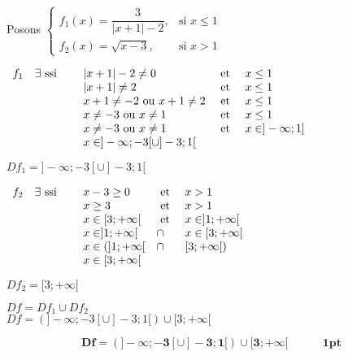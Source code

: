 \documentclass[12pt,a4paper]{article}
\begin{document}
\begin{enumerate}
Posons  $\left\{
        \begin{array}{ll}
            f_{1}(x) = \dfrac{3}{|x+1| - 2}, & \text{si } x \leq 1 \\
            f_{2}(x) = \sqrt{x - 3}, & \text{si } x > 1
        \end{array}
    \right.$
    
\( 
\begin{array}{llll}
            f_{1}\quad \exists \text{ ssi }& \quad  |x+1| - 2 \neq 0 & \text{ et } & x \leq 1 \\
       			 																&\quad  |x+1|  \neq 2 & \text{ et } & x \leq 1 \\
       																			&\quad  x+1  \neq -2\text{ ou } x+1  \neq 2 & \text{ et } & x \leq 1 \\
       																			&\quad  x \neq -3\text{ ou } x \neq 1 & \text{ et } & x \leq 1 \\
       																			&\quad  x \neq -3\text{ ou } x \neq 1 & \text{ et } & x \in ]-\infty;1] \\
       																			&\quad x \in ]-\infty;-3[\cup]-3;1[\\
        \end{array} \\
\) 

\begin{center}
\( Df_{1} = ]-\infty;-3[\cup]-3;1[ \)\\
\end{center}     

\( 
\begin{array}{llll}
            f_{2}\quad \exists \text{ ssi }& \quad  x - 3 \geq 0 & \text{ et } & x > 1 \\
       			 																& \quad  x  \geq 3 & \text{ et } & x > 1 \\
       																			& \quad  x\in [3;+\infty[ & \text{ et } & x\in ]1;+\infty[\\
       																			& \quad  x \in ]1;+\infty[ & \cap & x \in[3;+\infty[\\
       																			& \quad  x \in ( ]1;+\infty[ & \cap &  [3;+\infty[)\\
       																			& \quad x \in [3;+\infty[
        \end{array} \\
\) 

\begin{center}
\( Df_{2} = [3;+\infty[ \)\\
\end{center}     

\begin{center}
\( Df=Df_{1} \cup Df_{2} \)\\
\( Df=(]-\infty;-3[\cup]-3;1[)\cup[3;+\infty[ \)
\end{center} 

              \begin{resultbox}
            \[
                \mathbf{Df = \left( ]-\infty;-3[\cup]-3;1[\right) \cup[3;+\infty[ \quad\quad\quad \textbf{1pt}}
            \]
        \end{resultbox}     
    
\end{enumerate}
\end{document}
